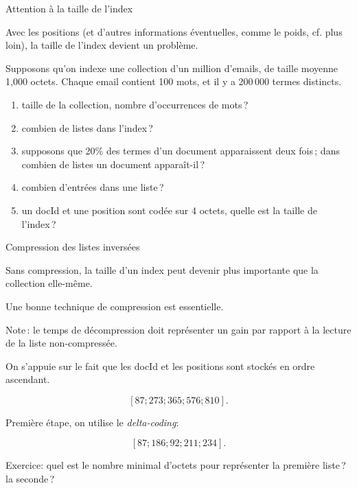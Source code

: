 \begin{frame}{Attention à la taille de l'index}
 
Avec les positions (et d'autres informations éventuelles, comme le poids, cf. plus loin), la taille de l'index
devient un problème.

\smallskip

Supposons qu'on indexe une collection d'un million d'emails, de taille moyenne 1,000 octets. Chaque
email contient 100 mots, et il y a 200\,000 termes distincts.


\begin{enumerate}
  \item taille de la collection, nombre d'occurrences de mots\,? %
  \item combien de listes dans l'index\,? %
  \item supposons que  20\% des termes d'un document apparaissent deux fois\,; dans combien de listes
      un document apparaît-il\,?  %
  \item combien d'entrées dans une liste\,? %
  \item  un docId et une position sont codée sur 4 octets, quelle est la taille de l'index\,? %
  
\end{enumerate}
\end{frame}


\begin{frame}{Compression des listes inversées}

Sans compression, la taille d'un index peut devenir plus importante que la collection elle-même.

\vfill
Une bonne technique de compression est essentielle. 

\vfill

Note\,: le temps de décompression doit représenter un gain par rapport à la lecture de la liste non-compressée.

\vfill
On s'appuie sur le fait que les docId et les positions sont stockés en ordre ascendant.

\[[87; 273; 365; 576; 810].\]

\vfill

Première étape, on utilise le \emph{delta-coding}:

\[[87; 186; 92; 211; 234].\]

Exercice: quel est le nombre minimal d'octets pour représenter la première liste\,? la seconde\,?
\end{frame}


